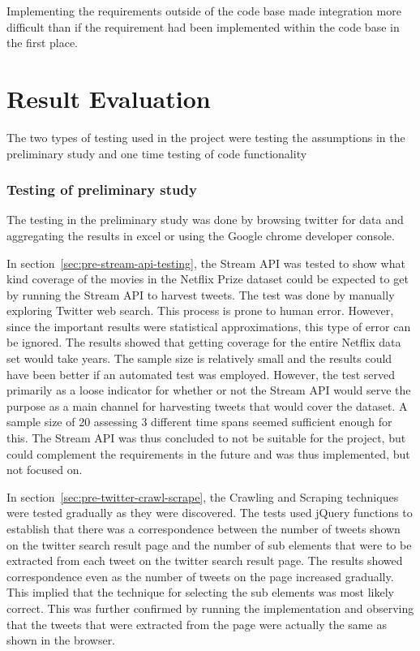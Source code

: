 Implementing the requirements outside of the code base made integration more difficult than if the requirement had been implemented within the code base in the first place.

\section{Result Evaluation}
The two types of testing used in the project were testing the assumptions in the preliminary study and one time testing of code functionality

\subsubsection{Testing of preliminary study}
The testing in the preliminary study was done by browsing twitter for data and aggregating the results in excel or using the Google chrome developer console.

In section~\ref{sec:pre-stream-api-testing}, the Stream API was tested to show what kind coverage of the movies in the Netflix Prize dataset could be expected to get by running the Stream API to harvest tweets. The test was done by manually exploring Twitter web search. This process is prone to human error. However, since the important results were statistical approximations, this type of error can be ignored. The results showed that getting coverage for the entire Netflix data set would take years. The sample size is relatively small and the results could have been better if an automated test was employed. However, the test served primarily as a loose indicator for whether or not the Stream API would serve the purpose as a main channel for harvesting tweets that would cover the dataset. A sample size of 20 assessing 3 different
time spans seemed sufficient enough for this. The Stream API was thus concluded to not be suitable for the project, but could complement the requirements in the future and was thus implemented, but not focused on.

In section~\ref{sec:pre-twitter-crawl-scrape}, the Crawling and Scraping techniques were tested gradually as they were discovered. The tests used jQuery functions to establish that there was a correspondence between the number of tweets shown on the twitter search result page and the number of sub elements that were to be extracted from each tweet on the twitter search result page. The results showed correspondence even as the number of tweets on the page increased gradually. This implied that the technique for selecting the sub elements was most likely correct. This was further confirmed by running the implementation and observing that the tweets that were extracted from the page were actually the same as shown in the browser.

